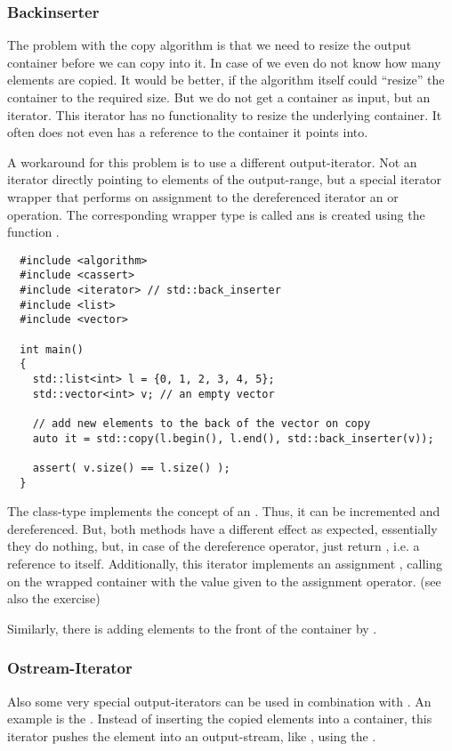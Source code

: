\subsubsection{Backinserter}
The problem with the copy algorithm is that we need to resize the output container before we can copy into it. In case of  we even do
not know how many elements are copied. It would be better, if the algorithm itself could ``resize'' the container to the required size. But we
do not get a container as input, but an iterator. This iterator has no functionality to resize the underlying container. It often does not even has
a reference to the container it points into.

A workaround for this problem is to use a different output-iterator. Not an iterator directly pointing to elements of the output-range, but a special
iterator wrapper that performs on assignment to the dereferenced iterator an  or  operation. The corresponding
wrapper type is called  ans is created using the function .
%
\begin{verbatim}
  #include <algorithm>
  #include <cassert>
  #include <iterator> // std::back_inserter
  #include <list>
  #include <vector>

  int main()
  {
    std::list<int> l = {0, 1, 2, 3, 4, 5};
    std::vector<int> v; // an empty vector

    // add new elements to the back of the vector on copy
    auto it = std::copy(l.begin(), l.end(), std::back_inserter(v));

    assert( v.size() == l.size() );
  }
\end{verbatim}

The class-type  implements the concept of an . Thus, it can be incremented and dereferenced. But, both
methods have a different effect as expected, essentially they do nothing, but, in case of the dereference operator, just return , i.e. a reference
to itself. Additionally, this iterator implements an assignment , calling  on the wrapped container with the
value given to the assignment operator. (see also the exercise)

Similarly, there is  adding elements to the front of the container by .


\subsubsection{Ostream-Iterator}
Also some very special output-iterators can be used in combination with . An example is the . Instead of
inserting the copied elements into a container, this iterator pushes the element into an output-stream, like , using the .

